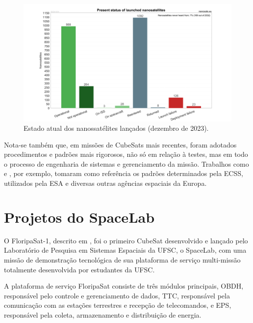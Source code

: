 \begin{figure}[htp]
    \caption{Estado atual dos nanossatélites lançados (dezembro de 2023).}
    \begin{center}
        \includegraphics[width=\textwidth, keepaspectratio]{images/Nanosats_status_2023-12-31_large.png}
    \end{center}
    \label{fig:status-nanosats}
\end{figure}


Nota-se também que, em missões de CubeSats mais recentes, foram adotados procedimentos e padrões mais rigorosos, não só em relação à testes, mas em todo o processo de engenharia de sistemas e gerenciamento da missão.
Trabalhos como \textcite{floripasat-1} e \textcite{tailoring-ecss-nanosat}, por exemplo, tomaram como referência os padrões determinados pela \gls{ECSS}, utilizados pela \gls{ESA} e diversas outras agências espaciais da Europa.

\section{Projetos do SpaceLab}\label{sec:intro-spacelab}

O FloripaSat-1, descrito em \textcite{floripasat-1}, foi o primeiro CubeSat desenvolvido e lançado pelo Laboratório de Pesquisa em Sistemas Espaciais da UFSC, o SpaceLab, com uma missão de demonstração tecnológica de sua plataforma de serviço multi-missão totalmente desenvolvida por estudantes da \gls{UFSC}.

A plataforma de serviço FloripaSat consiste de três módulos principais, \gls{OBDH}, responsável pelo controle e gerenciamento de dados, \gls{TTC}, responsável pela comunicação com as estações terrestres e recepção de telecomandos, e \gls{EPS}, responsável pela coleta, armazenamento e distribuição de energia.

